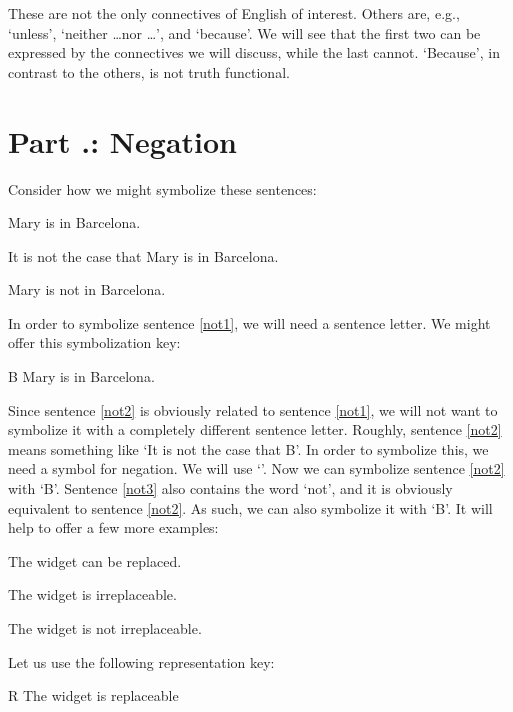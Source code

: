 These are not the only connectives of English of interest. Others are, e.g., ‘unless’, ‘neither \ldots nor \ldots ’, and ‘because’. We will see that the first two can be expressed by the connectives we will discuss, while the last cannot. ‘Because’, in contrast to the others, is not truth functional.

\section{Part \thechapcount.\theseccount: Negation }
\label{s:Part 5.1 Negation}
Consider how we might symbolize these sentences:
\begin{earg}
	\item[\ex{not1}] Mary is in Barcelona.
	\item[\ex{not2}] It is not the case that Mary is in Barcelona.
	\item[\ex{not3}] Mary is not in Barcelona.
	\end{earg}
In order to symbolize sentence \ref{not1}, we will need a sentence letter. We might offer this symbolization key:
	\begin{ekey}
		\item[B] Mary is in Barcelona.
	\end{ekey}
Since sentence \ref{not2} is obviously related to sentence \ref{not1}, we will not want to symbolize it with a completely different sentence letter. Roughly, sentence \ref{not2} means something like ‘It is not the case that B’. In order to symbolize this, we need a symbol for \gls{negation}. We will use ‘\enot ’. Now we can symbolize sentence \ref{not2} with ‘\enot B’.
Sentence \ref{not3} also contains the word ‘not’, and it is obviously equivalent to sentence \ref{not2}. As such, we can also symbolize it with ‘\enot B’.
It will help to offer a few more examples:
	\begin{earg}
		\item[\ex{not4}] The widget can be replaced.
		\item[\ex{not5}] The widget is irreplaceable.
		\item[\ex{not5b}] The widget is not irreplaceable.
	\end{earg}
Let us use the following representation key:
	\begin{ekey}
		\item[R] The widget is replaceable
	\end{ekey}
